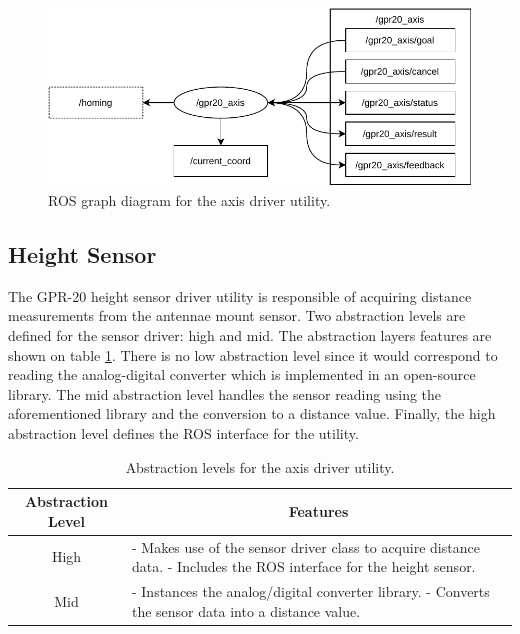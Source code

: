 \documentclass{article}
\begin{document}
\begin{figure}[H]
    \centering
    \includegraphics{images/ROS/axis_driver/ros_axis_driver.pdf}
    \caption{ROS graph diagram for the axis driver utility.}
    \label{fig:axis_ros_graph}
\end{figure}

\subsection{Height Sensor}
The GPR-20 height sensor driver utility is responsible of acquiring distance measurements from the antennae mount sensor. Two abstraction levels are defined for the sensor driver: high and mid. The abstraction layers features are shown on table \ref{tab:height_abstraction}. There is no low abstraction level since it would correspond to reading the analog-digital converter which is implemented in an open-source library. The mid abstraction level handles the sensor reading using the aforementioned library and the conversion to a distance value. Finally, the high abstraction level defines the ROS interface for the utility.

\begin{table}[H]
    \centering
    \begin{tabular}{|c|p{10cm}|}
        \hline
        \textbf{Abstraction Level} & \multicolumn{1}{c|}{\textbf{Features}} \\ \hline
        High & - Makes use of the sensor driver class to acquire distance data. \newline - Includes the ROS interface for the height sensor. \\ \hline
        Mid & - Instances the analog/digital converter library. \newline - Converts the sensor data into a distance value. \\ \hline
    \end{tabular}
    \caption{Abstraction levels for the axis driver utility.}
    \label{tab:height_abstraction}
\end{table}
\end{document}
